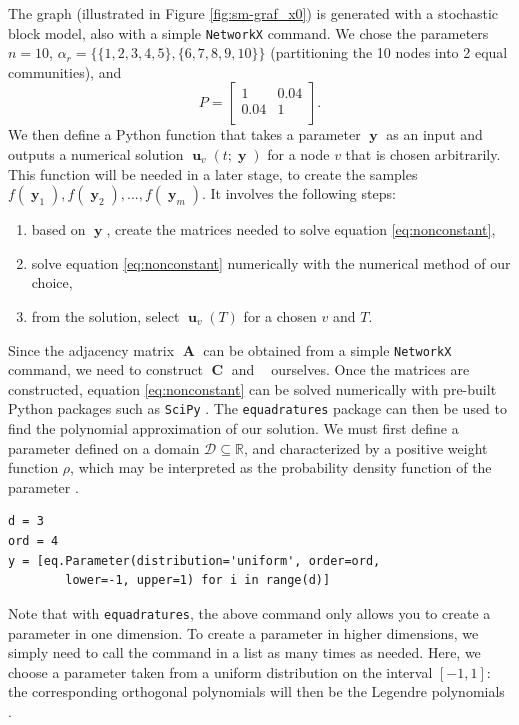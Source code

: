 \documentclass[12pt, oneside]{report}   	%
\newcommand{\R}{\mathbb{R}}
\DeclareMathOperator{\Adj}{\boldsymbol{A}}
\DeclareMathOperator{\CC}{\boldsymbol{C}}
\DeclareMathOperator{\DC}{\boldsymbol{D}(\boldsymbol{C})}
\DeclareMathOperator{\uu}{\boldsymbol{u}}
\DeclareMathOperator{\y}{\boldsymbol{y}}
\begin{document}
\noindent The graph (illustrated in Figure \ref{fig:sm-graf_x0}) is generated with a stochastic block model, also with a simple \texttt{NetworkX} command. We chose the parameters $n=10$, $\alpha_r=\{\{1,2,3,4,5\}, \{6,7,8,9,10\}\}$ (partitioning the 10 nodes into 2 equal communities), and
$$
 P =
\begin{bmatrix}
1 & 0.04 \\
0.04 & 1 \\
\end{bmatrix}.
$$
We then define a Python function that takes a parameter $\y$ as an input and outputs a numerical solution $\uu_v(t;\y)$ for a node $v$ that is chosen arbitrarily. This function will be needed in a later stage, to create the samples $f(\y_1), f(\y_2), ..., f(\y_m)$. It involves the following steps:
\begin{enumerate}
    \item based on $\y$, create the matrices needed to solve equation \eqref{eq:nonconstant},
    \item solve equation \eqref{eq:nonconstant} numerically with the numerical method of our choice,
    \item from the solution, select $\uu_v(T)$ for a chosen $v$ and $T$.
\end{enumerate}

\noindent Since the adjacency matrix $\Adj$ can be obtained from a simple \texttt{NetworkX} command, we need to construct $\CC$ and $\DC$ ourselves. Once the matrices are constructed, equation \eqref{eq:nonconstant} can be solved numerically with pre-built Python packages such as \texttt{SciPy} \cite{2020SciPy-NMeth}. The \texttt{equadratures} package \cite{equad} can then be used to find the polynomial approximation of our solution. We must first define a parameter defined on a domain $\mathcal{D}\subseteq\R$, and characterized by a positive weight function $\rho$, which may be interpreted as the probability density function of the parameter \cite{equad}.\\

\begin{tcolorbox}[colframe=white]
\begin{verbatim}
d = 3
ord = 4
y = [eq.Parameter(distribution='uniform', order=ord, 
        lower=-1, upper=1) for i in range(d)]
\end{verbatim}
\end{tcolorbox}
\smallskip

\noindent Note that with \texttt{equadratures}, the above command only allows you to create a parameter in one dimension. To create a parameter in higher dimensions, we simply need to call the command in a list as many times as needed. Here, we choose a parameter taken from a uniform distribution on the interval $[-1,1]$: the corresponding orthogonal polynomials will then be the Legendre polynomials \cite{equad}.\\
\end{document}
